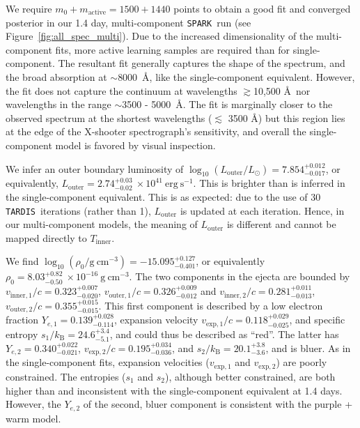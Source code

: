 \documentclass[twocolumn,twocolappendix]{aastex63}
\def\SPARK{\texttt{SPARK}}
\def\TARDIS{\texttt{TARDIS}}
\begin{document}
We require $m_0 + m_{\mathrm{active}} = 1500 + 1440$ points to obtain a good fit and converged posterior in our 1.4 day, multi-component \SPARK~run (see Figure~\ref{fig:all_spec_multi}). Due to the increased dimensionality of the multi-component fits, more active learning samples are required than for single-component. The resultant fit generally captures the shape of the spectrum, and the broad absorption at $\sim$8000~\AA, like the single-component equivalent. However, the fit does not capture the continuum at wavelengths $\gtrsim$10,500 \AA~nor wavelengths in the range $\sim$3500 - 5000~\AA. The fit is marginally closer to the observed spectrum at the shortest wavelengths ($\lesssim$ 3500 \AA) but this region lies at the edge of the X-shooter spectrograph's sensitivity, and overall the single-component model is favored by visual inspection. 

We infer an outer boundary luminosity of $\log_{10} (L_{\mathrm{outer}}/L_{\odot}) = 7.854^{+0.012}_{-0.017}$, or equivalently, $L_{\mathrm{outer}} = 2.74^{+0.03}_{-0.02}~\times 10^{41}~\mathrm{erg~s^{-1}}$. This is brighter than is inferred in the single-component equivalent. This is as expected: due to the use of 30 \TARDIS~iterations (rather than 1), $L_{\mathrm{outer}}$ is updated at each iteration. Hence, in our multi-component models, the meaning of $L_{\mathrm{outer}}$ is different and cannot be mapped directly to $T_{\mathrm{inner}}$.

We find $\log_{10} (\rho_0 / \mathrm{g~cm^{-3}}) = -15.095^{+0.127}_{-0.401}$, or equivalently $\rho_0 = 8.03^{+0.82}_{-0.50}~\times 10^{-16}~\mathrm{g~cm^{-3}}$. The two components in the ejecta are bounded by $v_{\mathrm{inner,1}}/c = 0.323^{+0.007}_{-0.020}$, $v_{\mathrm{outer,1}}/c = 0.326^{+0.009}_{-0.012}$ and $v_{\mathrm{inner,2}}/c = 0.281^{+0.011}_{-0.013}$, $v_{\mathrm{outer,2}}/c = 0.355^{+0.015}_{-0.015}$. This first component is described by a low electron fraction $Y_{e,1} = 0.139^{+0.028}_{-0.114}$, expansion velocity $v_{\mathrm{exp},1}/c = 0.118^{+0.029}_{-0.025}$, and specific entropy $s_1 / k_{\mathrm{B}} = 24.6^{+3.4}_{-5.1}$, and could thus be described as ``red''. The latter has $Y_{e,2} = 0.340^{+0.022}_{-0.021}$, $v_{\mathrm{exp},2}/c = 0.195^{+0.034}_{-0.036}$, and $s_2 / k_{\mathrm{B}} = 20.1^{+3.8}_{-3.6}$, and is bluer. As in the single-component fits, expansion velocities ($v_{\mathrm{exp},1}$ and $v_{\mathrm{exp},2}$) are poorly constrained. The entropies ($s_1$ and $s_2$), although better constrained, are both higher than and inconsistent with the single-component equivalent at 1.4 days. However, the $Y_{e,2}$ of the second, bluer component is consistent with the purple + warm model.  
\end{document}
